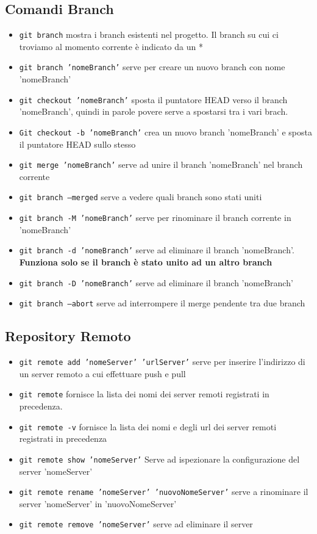 \documentclass[12pt, a4paper]{article}
\begin{document}
\subsection{Comandi Branch}
\begin{itemize}
    \item \texttt{git branch} mostra i branch esistenti nel progetto. Il branch su cui ci troviamo al momento corrente è indicato da un *
    \item \texttt{git branch 'nomeBranch'} serve per creare un nuovo branch con nome 'nomeBranch'
    \item \texttt{git checkout 'nomeBranch'} sposta il puntatore HEAD verso il branch 'nomeBranch', quindi in parole povere serve a spostarsi tra i vari brach.
    \item \texttt{Git checkout -b 'nomeBranch'} crea un nuovo branch 'nomeBranch' e sposta il puntatore HEAD sullo stesso
    \item \texttt{git merge 'nomeBranch'} serve ad unire il branch 'nomeBranch' nel branch corrente
    \item \texttt{git branch --merged} serve a vedere quali branch sono stati uniti
    \item \texttt{git branch -M 'nomeBranch'} serve per rinominare il branch corrente in 'nomeBranch'
    \item \texttt{git branch -d 'nomeBranch'} serve ad eliminare il branch 'nomeBranch'. \textbf{Funziona solo se il branch è stato unito ad un altro branch}
    \item \texttt{git branch -D 'nomeBranch'} serve ad eliminare il branch 'nomeBranch'
    \item \texttt{git branch --abort} serve ad interrompere il merge pendente tra due branch
\end{itemize}

\subsection{Repository Remoto}
\begin{itemize}
    \item \texttt{git remote add 'nomeServer' 'urlServer'} serve per inserire l’indirizzo di un server remoto a cui effettuare push e pull
    \item \texttt{git remote} fornisce la lista dei nomi dei server remoti registrati in precedenza.
    \item \texttt{git remote -v} fornisce la lista dei nomi e degli url dei server remoti registrati in precedenza
    \item \texttt{git remote show 'nomeServer'} Serve ad ispezionare la configurazione del server 'nomeServer'
    \item \texttt{git remote rename 'nomeServer' 'nuovoNomeServer'} serve a rinominare il server 'nomeServer' in 'nuovoNomeServer'
    \item \texttt{git remote remove 'nomeServer'} serve ad eliminare il server
\end{itemize}
\end{document}
